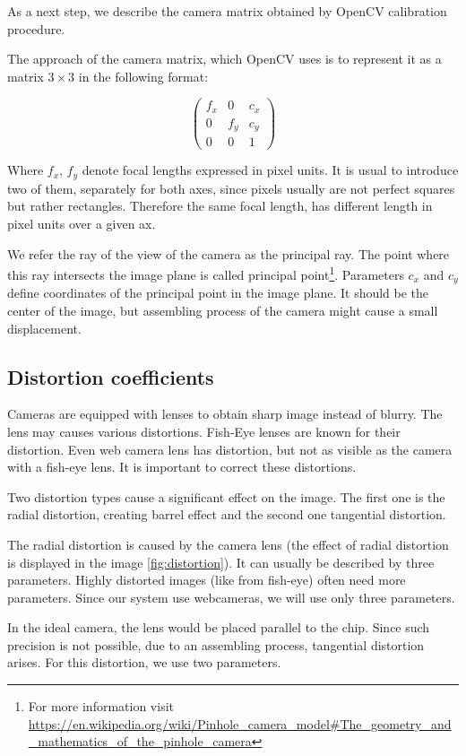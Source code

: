 As a next step, we describe the camera matrix obtained by OpenCV calibration
procedure.

The approach of the camera matrix, which OpenCV uses is to represent it as a
matrix $3\times3$ in the following format: 

\[
\begin{pmatrix}
	f_x 	& 0 	& c_x \\
	0	& f_y	& c_y \\
	0	& 0	& 1
\end{pmatrix}
\]

Where $f_x$, $f_y$ denote focal lengths expressed in pixel units. It is usual
to introduce two of them, separately for both axes, since pixels usually are
not perfect squares but rather rectangles. Therefore the same focal length, has
different length in pixel units over a given ax.

We refer the ray of the view of the camera as the principal ray. The point
where this ray intersects the image plane is called principal
point\footnote{For more information visit \url{https://en.wikipedia.org/wiki/Pinhole_camera_model\#The_geometry_and_mathematics_of_the_pinhole_camera}}.
Parameters $c_x$ and $c_y$ define coordinates of the principal point in the
image plane.  It should be the center of the image, but assembling process of
the camera might cause a small displacement.

\subsection{Distortion coefficients}

Cameras are equipped with lenses to obtain sharp image instead of blurry. The
lens may causes various distortions. Fish-Eye lenses are known for their
distortion.  Even web camera lens has distortion, but not as visible as the
camera with a fish-eye lens. It is important to correct these distortions.

Two distortion types cause a significant effect on the image. The first one is
the radial distortion, creating barrel effect and the second one tangential distortion.

The radial distortion is caused by the camera lens (the effect of radial
distortion is displayed in the image \ref{fig:distortion}). It can usually be
described by three parameters. Highly distorted images (like from fish-eye)
often need more parameters. Since our system use webcameras, we will use only
three parameters.

In the ideal camera, the lens would be placed parallel to the chip. Since such
precision is not possible, due to an assembling process, tangential distortion
arises. For this distortion, we use two parameters.

